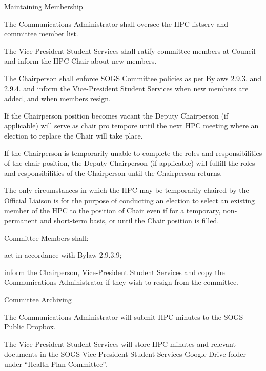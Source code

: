 \begin{longenum}[ label*=\thesubsection.\arabic*., align=left]
\item Maintaining Membership
	\begin{longenum}[label*=\arabic*., align=left]	
	\item The Communications Administrator shall oversee the HPC listserv and committee member list.
	\item The Vice-President Student Services shall ratify committee members at Council and inform the HPC Chair about new members.
	\item The Chairperson shall enforce SOGS Committee policies as per Bylaws 2.9.3. and 2.9.4. and inform the Vice-President Student Services when new members are added, and when members resign.
		\begin{longenum}[label*=\arabic*., align=left]	
		\item If the Chairperson position becomes vacant the Deputy Chairperson (if applicable) will serve as chair pro tempore until the next HPC meeting where an election to replace the Chair will take place.
		\item If the Chairperson is temporarily unable to complete the roles and responsibilities of the chair position, the Deputy Chairperson (if applicable) will fulfill the roles and responsibilities of the Chairperson until the Chairperson returns.
		\item The only circumstances in which the HPC may be temporarily chaired by the Official Liaison is for the purpose of conducting an election to select an existing member of the HPC to the position of Chair even if for a temporary, non-permanent and short-term basis, or until the Chair position is filled. 
		\end{longenum}
	\item Committee Members shall:
		\begin{longenum}[label*=\arabic*., align=left]	
		\item act in accordance with Bylaw 2.9.3.9;
		\item inform the Chairperson, Vice-President Student Services and copy the Communications Administrator if they wish to resign from the committee.
		\end{longenum}
	\end{longenum}
\item Committee Archiving
	\begin{longenum}[label*=\arabic*., align=left]	
	\item The Communications Administrator will submit HPC minutes to the SOGS Public Dropbox.
	\item The Vice-President Student Services will store HPC minutes and relevant documents in the SOGS Vice-President Student Services Google Drive folder under “Health Plan Committee”.

\end{longenum}
\end{longenum}
